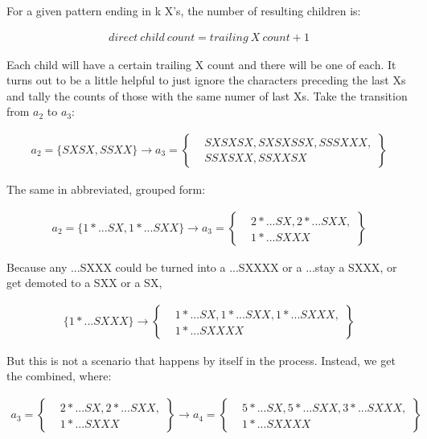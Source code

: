 \documentclass{article}
\begin{document}
For a given pattern ending in k X's, the number of resulting children is:

\begin{align}
  direct~child~count=trailing~X~count + 1
\end{align}

Each child will have a certain trailing X count and there will be one of each.  It turns out to be a little helpful to just ignore the characters preceding the last Xs and tally the counts of those with the same numer of last Xs.  Take the transition from $a_2$ to $a_3$:

\begin{align*}
  a_2 = \{SXSX,SSXX\} \rightarrow a_3 =
  \left\{
    \begin{aligned}
      & SXSXSX, SXSXSSX, SSSXXX, \\
      & SSXSXX, SSXXSX
    \end{aligned}
  \right\}
\end{align*}

The same in abbreviated, grouped form:

\begin{align*}
  a_2 = \{1 * ...SX,1 * ...SXX\} \rightarrow a_3 =
  \left\{
    \begin{aligned}
      & 2 * ...SX, 2 * ...SXX, \\
      & 1 * ...SXXX
    \end{aligned}
  \right\}
\end{align*}

Because any ...SXXX could be turned into a ...SXXXX or a ...stay a SXXX, or get demoted to a SXX or a SX,

\begin{align*}
  \{1 * ...SXXX\} \rightarrow
  \left\{
    \begin{aligned}
      & 1 * ...SX, 1 * ...SXX, 1 * ...SXXX, \\
      & 1 * ...SXXXX
    \end{aligned}
  \right\}
\end{align*}

But this is not a scenario that happens by itself in the process.  Instead, we get the combined, where:



\begin{align*}
  a_3 = 
  \left\{
    \begin{aligned}
      & 2 * ...SX, 2 * ...SXX, \\
      & 1 * ...SXXX
    \end{aligned}
  \right\} \rightarrow a_4 =
  \left\{
    \begin{aligned}
      & 5 * ...SX, 5 * ...SXX, 3 * ...SXXX, \\
      & 1 * ...SXXXX
    \end{aligned}
  \right\}
\end{align*}
\end{document}
